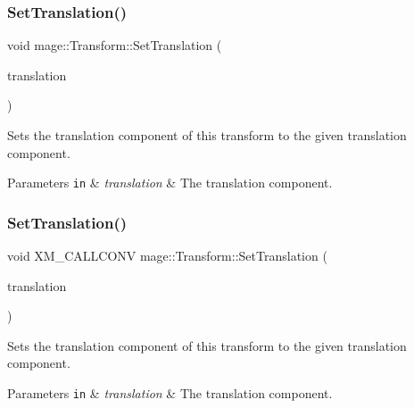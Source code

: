 \subsubsection{\texorpdfstring{Set\+Translation()}{SetTranslation()}\hspace{0.1cm}{\footnotesize\ttfamily [2/3]}}
{\footnotesize\ttfamily void mage\+::\+Transform\+::\+Set\+Translation (\begin{DoxyParamCaption}\item[{\hyperlink{namespacemage_a73fbe0da4b8d5bc156bb8453e5b63a17}{F32x3}}]{translation }\end{DoxyParamCaption})\hspace{0.3cm}{\ttfamily [noexcept]}}

Sets the translation component of this transform to the given translation component.


\begin{DoxyParams}[1]{Parameters}
\mbox{\tt in}  & {\em translation} & The translation component. \\
\hline
\end{DoxyParams}
\hypertarget{classmage_1_1_transform_a0c93ec5483091d4be508e11d5c05579e}{}\label{classmage_1_1_transform_a0c93ec5483091d4be508e11d5c05579e} 
\subsubsection{\texorpdfstring{Set\+Translation()}{SetTranslation()}\hspace{0.1cm}{\footnotesize\ttfamily [3/3]}}
{\footnotesize\ttfamily void X\+M\+\_\+\+C\+A\+L\+L\+C\+O\+NV mage\+::\+Transform\+::\+Set\+Translation (\begin{DoxyParamCaption}\item[{F\+X\+M\+V\+E\+C\+T\+OR}]{translation }\end{DoxyParamCaption})\hspace{0.3cm}{\ttfamily [noexcept]}}

Sets the translation component of this transform to the given translation component.


\begin{DoxyParams}[1]{Parameters}
\mbox{\tt in}  & {\em translation} & The translation component. \\
\hline
\end{DoxyParams}
\hypertarget{classmage_1_1_transform_a99a7e4aaba6cee799bb014d9a1b5e227}{}\label{classmage_1_1_transform_a99a7e4aaba6cee799bb014d9a1b5e227} 
